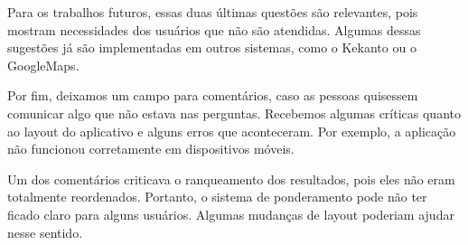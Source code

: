 Para os trabalhos futuros, essas duas últimas questões são relevantes, pois mostram necessidades dos usuários que não são atendidas. Algumas dessas sugestões já são implementadas em outros sistemas, como o Kekanto ou o GoogleMaps.

Por fim, deixamos um campo para comentários, caso as pessoas quisessem comunicar algo que não estava nas perguntas. Recebemos algumas críticas quanto ao layout do aplicativo e alguns erros que aconteceram. Por exemplo, a aplicação não funcionou corretamente em dispositivos móveis.

Um dos comentários criticava o ranqueamento dos resultados, pois eles não eram totalmente reordenados. Portanto, o sistema de ponderamento pode não ter ficado claro para alguns usuários. Algumas mudanças de layout poderiam ajudar nesse sentido.